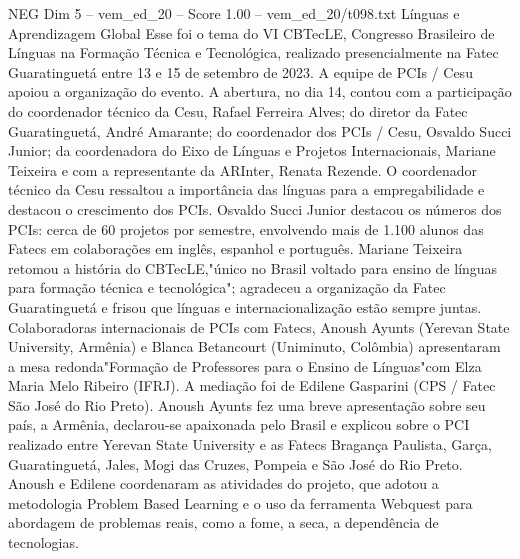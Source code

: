 \begin{textsample}{NEG Dim 5 – vem\_ed\_20 – Score 1.00 – vem\_ed\_20/t098.txt}  \label{ex:f5_neg_061}
Línguas e Aprendizagem Global Esse foi o tema do VI CBTecLE, Congresso Brasileiro de Línguas na Formação Técnica e Tecnológica, realizado presencialmente na Fatec Guaratinguetá entre 13 e 15 de setembro de 2023.
A equipe de PCIs / Cesu apoiou a organização do evento.
A abertura, no dia 14, contou com a participação do coordenador técnico da Cesu, Rafael Ferreira Alves; do diretor da Fatec Guaratinguetá, André Amarante; do coordenador dos PCIs / Cesu, Osvaldo Succi Junior; da coordenadora do Eixo de Línguas e Projetos Internacionais, Mariane Teixeira e com a representante da ARInter, Renata Rezende.
O coordenador técnico da Cesu ressaltou a importância das línguas para a empregabilidade e destacou o crescimento dos PCIs.
Osvaldo Succi Junior destacou os números dos PCIs: cerca de 60 projetos por semestre, envolvendo mais de 1.100 alunos das Fatecs em colaborações em inglês, espanhol e português.
Mariane Teixeira retomou a história do CBTecLE,"único no Brasil voltado para ensino de línguas para formação técnica e tecnológica"; agradeceu a organização da Fatec Guaratinguetá e frisou que línguas e internacionalização estão sempre juntas.
Colaboradoras internacionais de PCIs com Fatecs, Anoush Ayunts (Yerevan State University, Armênia) e Blanca Betancourt (Uniminuto, Colômbia) apresentaram a mesa redonda"Formação de Professores para o Ensino de Línguas"com Elza Maria Melo Ribeiro (IFRJ).
A mediação foi de Edilene Gasparini (CPS / Fatec São José do Rio Preto).
Anoush Ayunts fez uma breve apresentação sobre seu país, a Armênia, declarou-se apaixonada pelo Brasil e explicou sobre o PCI realizado entre Yerevan State University e as Fatecs Bragança Paulista, Garça, Guaratinguetá, Jales, Mogi das Cruzes, Pompeia e São José do Rio Preto.
Anoush e Edilene coordenaram as atividades do projeto, que adotou a metodologia Problem Based Learning e o uso da ferramenta Webquest para abordagem de problemas reais, como a fome, a seca, a dependência de tecnologias.

\end{textsample}
